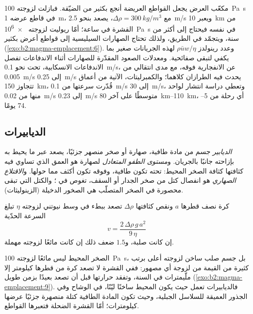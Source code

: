 مكعّب العرض يجعل القواطع العريضة أنجع بكثير من الضيّقة. فبازلت
لزوجته \qty{100}{Pa.s} في قاطع عرضه \qty{1}{m}، مع $\Delta\rho =
\qty{300}{kg/m^3}$، يصعد بنحو \qty{2.5}{m/s} ويعبر \qty{10}{km} من
القشرة في ساعة؛ أمّا ريوليت لزوجته \qty{e6}{Pa.s} في  نفسه فيحتاج إلى أكثر
من سنة، ويتجمّد في الطريق، ولذلك تحتاج الصهارات السيليسية إلى قواطع أعرض بكثير
(\cref{exo:b2:magma-emplacement:6}). وعدد رينولدز $\rho\bar u w/\eta$ لهذه الجريانات
صغير بما يكفي لتبقى صفائحية. ومعدلات الصعود المقدّرة للصهارات
أثناء الاندفاعات تفصل الاندفاعات الانسكابية، تحت نحو \qty{0.1}{m/s}، عن
الانفجارية فوقه، مع مدى انتقالي من \qty{0.005}{m/s} إلى \qty{0.25}{m/s}
يحدث فيه الطرازان كلاهما؛ والكمبرليتات، الآتية من
أعماق تتجاوز \qty{150}{km}، قُدّرت سرعتها من \qty{0.1}{m/s} إلى \qty{30}{m/s}،
وتعطي دراسة انتشار لواحد منها من \qty{0.02}{m/s} إلى \qty{0.23}{m/s} متوسطًا على
آخر \qtyrange{80}{110}{km}، أي رحلة من \numrange{5}{74} يومًا.

\subsection{الديابيرات}

\begin{definition}\label{def:b2:magma-emplacement:ascent}
\emph{الديابير} جسم من مادة طافية، صهارة أو صخر منصهر
جزئيًا، يصعد عبر ما يحيط به بإزاحته جانبًا بالجريان.
و\emph{مستوى الطفو المتعادل} لصهارة هو
العمق الذي تساوي فيه كثافتها كثافة الصخر المحيط: تحته تكون
 طافية، وفوقه تكون أكثف مما حولها. و\emph{الاقتلاع
الصهاري} هو انفصال كتل من صخر الجدار أو
السقف، تغوص في ؛ والكتل التي تبقى محصورة في الصخر المتصلّب
هي الصخور الدخيلة (الزينوليثات).
\end{definition}

\begin{proposition}\label{prop:b2:magma-emplacement:stokes}
كرة نصف قطرها $a$ ونقص كثافتها $\Delta\rho$ تصعد ببطء في
وسط نيوتني لزوجته $\eta$ تبلغ السرعة الحدّية
\[
v = \frac{2\,\Delta\rho\,g\,a^2}{9\,\eta}
\]
إن كانت صلبة، و$1.5$ ضعف ذلك إن كانت مائعًا لزوجته مهملة.
\end{proposition}
\admitted

الصخر المحيط  ليس مائعًا لزوجته \qty{100}{Pa.s}، بل جسم صلب ساخن
لزوجته أعلى برتب كثيرة من القيمة من لزوجة أي مصهور: ففي
القشرة لا تصعد كرة من  قطرها كيلومتر إلا ملّيمترات في السنة،
وتفقد حرارتها قبل أن تصعد بعيدًا بزمن طويل (\cref{exo:b2:magma-emplacement:9}). فالديابيرات
تعمل حيث يكون المحيط ساخنًا ليّنًا، في الوشاح وفي الجذور العميقة
للسلاسل الجبلية، وحيث تكون المادة الطافية كتلة منصهرة جزئيًا
عرضها كيلومترات؛ أمّا القشرة الضحلة فتعبرها القواطع.

